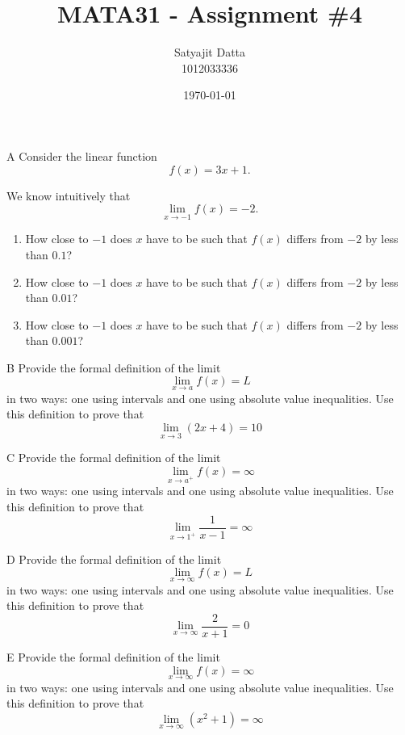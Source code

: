 \documentclass[]{article}
\title{\textbf{MATA31 - Assignment \#4}}
\author{ Satyajit Datta \\ 1012033336}
\date{\today}
\begin{document}
\maketitle

\begin{question}{A}
Consider the linear function
\[
f(x) = 3x + 1.
\]

We know intuitively that
\[
\lim_{x \to -1} f(x) = -2.
\]

\begin{enumerate}[label=\textbf{\Alph*.}]
    \item How close to $-1$ does $x$ have to be such that $f(x)$ differs from $-2$
    by less than $0.1$?
    \item How close to $-1$ does $x$ have to be such that $f(x)$ differs from $-2$
    by less than $0.01$?
    \item How close to $-1$ does $x$ have to be such that $f(x)$ differs from $-2$
    by less than $0.001$?
\end{enumerate}
\end{question}

\begin{question}{B}
    Provide the formal definition of the limit
    \[
    \lim_{x \to a} f(x) = L
    \]
    in two ways: one using intervals and one using absolute value inequalities. Use this definition to prove that
    \[
    \lim_{x \to 3} (2x+4) = 10
    \]
\end{question}

\begin{question}{C}
    Provide the formal definition of the limit
    \[
    \lim_{x \to a^+} f(x) = \infty
    \]
    in two ways: one using intervals and one using absolute value inequalities. Use this definition to prove that
    \[
    \lim_{x \to 1^+} \frac{1}{x-1} = \infty
    \]
\end{question}

\begin{question}{D}
    Provide the formal definition of the limit
    \[
    \lim_{x \to \infty} f(x) = L
    \]
    in two ways: one using intervals and one using absolute value inequalities. Use this definition to prove that
    \[
    \lim_{x \to \infty} \frac{2}{x+1} = 0
    \]
\end{question}

\begin{question}{E}
    Provide the formal definition of the limit
    \[
    \lim_{x \to \infty} f(x) = \infty
    \]
    in two ways: one using intervals and one using absolute value inequalities. Use this definition to prove that
    \[
    \lim_{x \to \infty} (x^2+1) = \infty
    \]
\end{question}
\end{document}
